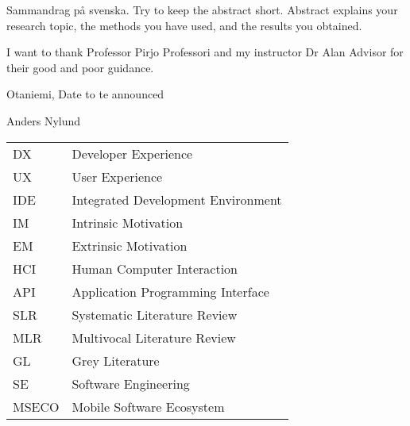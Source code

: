 \documentclass[english, 12pt, a4paper, sci, utf8, a-1b, online]{aaltothesis}
\begin{document}
\newpage

%
\begin{abstractpage}[swedish]
  Sammandrag på svenska.
  Try to keep the abstract short. Abstract explains your research topic,
  the methods you have used, and the results you obtained.
\end{abstractpage}

I want to thank Professor Pirjo Professori and my instructor Dr Alan Advisor for their good and poor guidance.

\vspace{5cm}
Otaniemi, Date to te announced

\vspace{5mm}
{\hfill Anders Nylund \hspace{1cm}}

\newpage


\thesistableofcontents


\begin{tabular}{ll}
  DX    & Developer Experience               \\
  UX    & User Experience                    \\
  IDE   & Integrated Development Environment \\
  IM    & Intrinsic Motivation               \\
  EM    & Extrinsic Motivation               \\
  HCI   & Human Computer Interaction         \\
  API   & Application Programming Interface  \\
  SLR   & Systematic Literature Review       \\
  MLR   & Multivocal Literature Review       \\
  GL    & Grey Literature                    \\
  SE    & Software Engineering               \\
  MSECO & Mobile Software Ecosystem          \\
\end{tabular}
\end{document}
